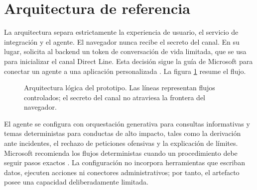 \section{Arquitectura de referencia}

La arquitectura separa estrictamente la experiencia de usuario, el servicio de integraci\'on y el agente. El navegador nunca recibe el secreto del canal. En su lugar, solicita al backend un token de conversaci\'on de vida limitada, que se usa para inicializar el canal Direct Line. Esta decisi\'on sigue la gu\'ia de Microsoft para conectar un agente a una aplicaci\'on personalizada \cite{copilotDirectLine,copilotWebSecurity}. La figura \ref{fig:arquitectura} resume el flujo.

\begin{figure}[H]
\centering
{}
\caption{Arquitectura l\'ogica del prototipo. Las l\'ineas representan flujos controlados; el secreto del canal no atraviesa la frontera del navegador.}
\label{fig:arquitectura}
\end{figure}

El agente se configura con orquestaci\'on generativa para consultas informativas y temas deterministas para conductas de alto impacto, tales como la derivaci\'on ante incidentes, el rechazo de peticiones ofensivas y la explicaci\'on de l\'imites. Microsoft recomienda los flujos deterministas cuando un procedimiento debe seguir pasos exactos \cite{copilotOrchestration}. La configuraci\'on no incorpora herramientas que escriban datos, ejecuten acciones ni conectores administrativos; por tanto, el artefacto posee una capacidad deliberadamente limitada.

